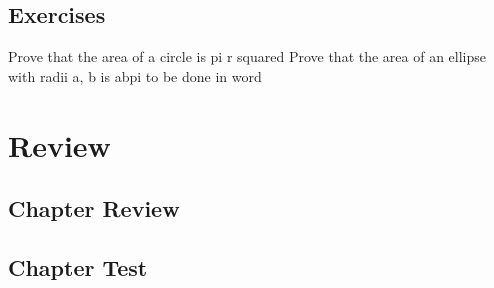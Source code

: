 \newpage
\subsection{Exercises}
Prove that the area of a circle is pi r squared
Prove that the area of an ellipse with radii a, b is abpi
to be done in word


\newpage
\section{Review}
\subsection{Chapter Review}
\subsection{Chapter Test}